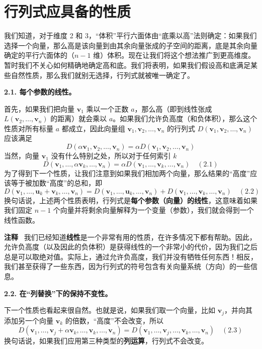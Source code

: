 \section{行列式应具备的性质}

我们知道，对于维度 2 和 3，“体积”平行六面体由“底乘以高”法则确定：如果我们选择一个向量，那么高是该向量到由其余向量张成的子空间的距离，底是其余向量确定的平行六面体的（$n-1$ 维）体积。现在让我们将这个想法推广到更高维度。暂时我们不关心如何精确地确定高和底。我们将表明，如果我们假设高和底满足某些自然性质，那么我们就别无选择，行列式就被唯一确定了。

\textbf{2.1. 每个参数的线性。}

首先，如果我们把向量 $\mathbf{v}_1$ 乘以一个正数 $a$，那么高（即到线性张成 $L(\mathbf{v}_2, \dots, \mathbf{v}_n)$ 的距离）就会乘以 $a$。如果我们允许负高度（和负体积），那么这个性质对所有标量 $a$ 都成立，因此向量组 $\mathbf{v}_1, \mathbf{v}_2, \dots, \mathbf{v}_n$ 的行列式 $D(\mathbf{v}_1, \mathbf{v}_2, \dots, \mathbf{v}_n)$ 应该满足
$$
D(\alpha \mathbf{v}_1, \mathbf{v}_2, \dots, \mathbf{v}_n) = \alpha D(\mathbf{v}_1, \mathbf{v}_2, \dots, \mathbf{v}_n)
$$
当然，向量 $\mathbf{v}_1$ 没有什么特别之处，所以对于任何索引 $k$
$$
D(\mathbf{v}_1, \dots, \alpha \mathbf{v}_k, \dots, \mathbf{v}_n) = \alpha D(\mathbf{v}_1, \dots, \mathbf{v}_k, \dots, \mathbf{v}_n) \quad (2.1)
$$
为了得到下一个性质，让我们注意到如果我们相加两个向量，那么结果的“高度”应该等于被加数“高度”的总和，即
$$
D(\mathbf{v}_1, \dots, \mathbf{u}_k + \mathbf{v}_k, \dots, \mathbf{v}_n) = D(\mathbf{v}_1, \dots, \mathbf{u}_k, \dots, \mathbf{v}_n) + D(\mathbf{v}_1, \dots, \mathbf{v}_k, \dots, \mathbf{v}_n) \quad (2.2)
$$
换句话说，上述两个性质表明，行列式是\textbf{每个参数（向量）的线性}，这意味着如果我们固定 $n-1$ 个向量并将剩余向量解释为一个变量（参数），我们就会得到一个线性函数。

\textbf{注释}~ 我们已经知道\textbf{线性}是一个非常有用的性质，在许多情况下都有帮助。因此，允许负高度（以及因此的负体积）是获得线性的一个非常小的代价，因为我们之后总是可以取绝对值。实际上，通过允许负高度，我们并没有牺牲任何东西！相反，我们甚至获得了一些东西，因为行列式的符号包含有关向量系统（方向）的一些信息。

\textbf{2.2. 在“列替换”下的保持不变性。}

下一个性质也看起来很自然。也就是说，如果我们取一个向量，比如 $\mathbf{v}_j$，并向其添加另一个向量 $\mathbf{v}_k$ 的倍数，“高度”不会改变，所以
$$
D(\mathbf{v}_1, \dots, \mathbf{v}_j + \alpha \mathbf{v}_k, \dots, \mathbf{v}_k, \dots, \mathbf{v}_n) = D(\mathbf{v}_1, \dots, \mathbf{v}_j, \dots, \mathbf{v}_k, \dots, \mathbf{v}_n) \quad (2.3)
$$
换句话说，如果我们应用第三种类型的\textbf{列运算}，行列式不会改变。

